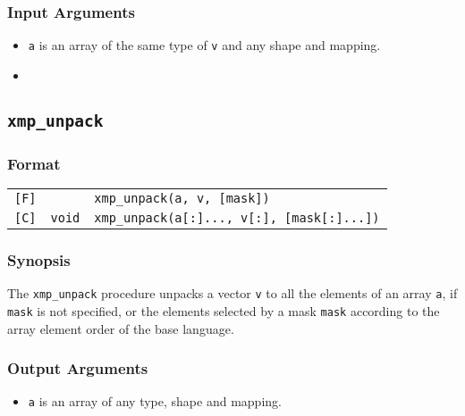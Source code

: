 \subsubsection*{Input Arguments}
\begin{itemize}
 \item {\tt a} is an array of the same type of {\tt v} and any shape
       and mapping.
 \item {}
\end{itemize}


\subsection{\tt xmp\_unpack}

\subsubsection*{Format}

\begin{tabular}{lll}

\verb![F]!&            & {\tt xmp\_unpack(a, v, [mask])}\\

\verb![C]!& {\tt void} & {\tt xmp\_unpack(a[:]..., v[:], [mask[:]...])}\\

\end{tabular}

\subsubsection*{Synopsis}

The {\tt xmp\_unpack} procedure unpacks a vector {\tt v} to all the
elements of an array {\tt a}, if {\tt mask} is not specified, or the
elements selected by a mask {\tt mask} according
to the array element order of the base language.

\subsubsection*{Output Arguments}
\begin{itemize}
 \item {\tt a} is an array of any type, shape and mapping.
\end{itemize}

